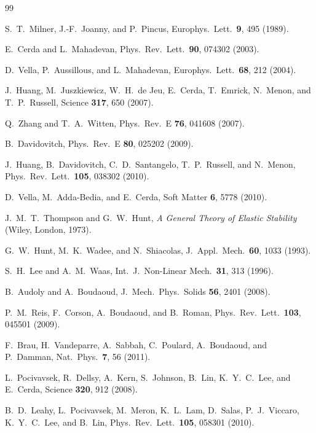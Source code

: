 \documentclass[prl,twocolumn,showpacs]{revtex4}
\begin{document}
\begin{thebibliography}{99}

S.\ T.\ Milner, J.-F.\ Joanny, and P.\ Pincus,
Europhys.\ Lett.\ \textbf{9}, 495 (1989).

E.\ Cerda and L.\ Mahadevan,
Phys.\ Rev.\ Lett.\ \textbf{90}, 074302 (2003).

D.\ Vella, P.\ Aussillous, and L.\ Mahadevan,
Europhys.\ Lett.\ \textbf{68}, 212 (2004).

J.\ Huang, M.\ Juszkiewicz, W.\ H.\ de Jeu, E.\ Cerda,
T.\ Emrick, N.\ Menon, and T.\ P.\ Russell,
Science \textbf{317}, 650 (2007).

Q.\ Zhang and T.\ A.\ Witten,
Phys.\ Rev.\ E \textbf{76}, 041608 (2007).

B.\ Davidovitch,
Phys.\ Rev.\ E \textbf{80}, 025202 (2009).

J.\ Huang, B.\ Davidovitch, C.\ D.\ Santangelo, T.\ P.\ Russell,
and N.\ Menon,
Phys.\ Rev.\ Lett.\ \textbf{105}, 038302 (2010).

D.\ Vella, M.\ Adda-Bedia, and E.\ Cerda,
Soft Matter \textbf{6}, 5778 (2010).

J.\ M.\ T.\ Thompson and G.\ W.\ Hunt,
\textit{A General Theory of Elastic Stability}
(Wiley, London, 1973).

G.\ W.\ Hunt, M.\ K.\ Wadee, and N.\ Shiacolas,
J.\ Appl.\ Mech.\ \textbf{60}, 1033 (1993).

S.\ H.\ Lee and A.\ M.\ Waas,
Int.\ J.\ Non-Linear Mech.\ \textbf{31}, 313 (1996).

B.\ Audoly and A.\ Boudaoud,
J.\ Mech.\ Phys.\ Solids \textbf{56}, 2401 (2008).

P.\ M.\ Reis, F.\ Corson, A.\ Boudaoud, and B.\ Roman,
Phys.\ Rev.\ Lett.\ \textbf{103}, 045501 (2009).

F.\ Brau, H.\ Vandeparre, A.\ Sabbah, C.\ Poulard,
A.\ Boudaoud, and P.\ Damman,
Nat.\ Phys.\ \textbf{7}, 56 (2011).

L.\ Pocivavsek, R.\ Dellsy, A.\ Kern, S.\ Johnson, B.\ Lin,
K.\ Y.\ C.\ Lee, and E.\ Cerda,
Science \textbf{320}, 912 (2008).

B.\ D.\ Leahy, L.\ Pocivavsek, M.\ Meron, K.\ L.\ Lam, D.\ Salas,
P.\ J.\ Viccaro, K.\ Y.\ C.\ Lee, and B.\ Lin,
Phys.\ Rev.\ Lett.\ \textbf{105}, 058301 (2010).


\end{thebibliography}
\end{document}
